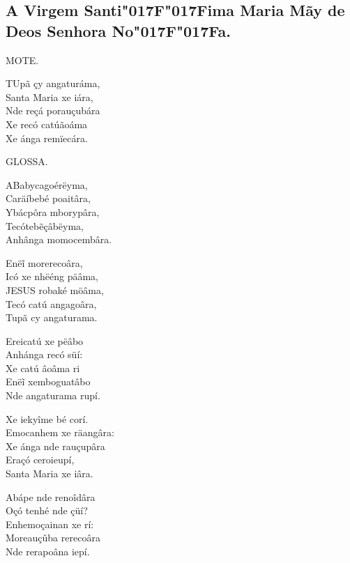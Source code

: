 \documentclass[openany,titlepage,12pt]{book}
\newcommand{\lgSS}{\char"017F\char"017F}
\begin{document}
\subsection{A Virgem Santi\lgSS ima Maria Mãy de Deos Senhora No\lgSS a.}

\begin{center}
    MOTE.
\end{center}
\unskip
\vspace{\baselineskip}
\lettrine[findent =4pt, nindent=0pt, lines=2]
{T}{U}pã çy angaturáma,\\
Santa Maria xe iára,\\
Nde reçá porauçubára\\
Xe recó catúãoáma\\
Xe ánga remïecára.\\
\begin{center}
    GLOSSA.
\end{center}
\unskip\vspace*{-4pt}
\lettrine[findent =4pt, nindent=0pt, lines=2]
{A}{B}abycagoérëyma,\\
Caräíbebé poaitâra,\\
Ybácpôra mborypâra,\\
Tecótebẽçâbëyma,\\
Anhânga momocembâra.

Enëĩ morerecoâra,\\
Icó xe nhëéng päâma,\\
JESUS robaké möâma,\\
Tecó catú angagoâra,\\
Tupã cy angaturama.

Ereicatú xe pëâbo\\
Anhánga recó süí:\\
Xe catú âoâma ri\\
Enëĩ xemboguatâbo\\
Nde angaturama rupí.

Xe iekyîme bé corí.\\
Emocanhem xe räangâra:\\
Xe ánga nde rauçupâra\\
Eraçó ceroieupí,\\
Santa Maria xe iâra.

Abápe nde renoîdâra\\
Oçó tenhé nde çüí?\\
Enhemoçainan xe rí:\\
Moreauçûba rerecoâra\\
Nde rerapoâna iepí.%
\end{document}
